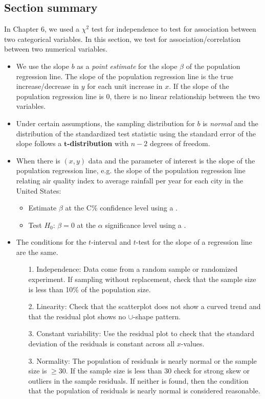 \D{\newpage}

\subsection*{Section summary}

\noindent In Chapter 6, we used a $\chi^2$ test for independence to test for association between two categorical variables.  In this section, we test for association/correlation between two numerical variables.
\begin{itemize}
\item We use the slope $b$ as a \emph{point estimate} for the slope $\beta$ of the population regression line.  The slope of the population regression line is the true increase/decrease in $y$ for each unit increase in $x$.  If the slope of the population regression line is 0, there is no linear relationship between the two variables.  
\item Under certain assumptions, the sampling distribution for $b$ is \emph{normal} and the distribution of the standardized test statistic using the standard error of the slope follows a $\pmb{t}$\textbf{-distribution} with $n-2$ degrees of freedom.

\item When there is $(x, y)$ data and the parameter of interest is the slope of the population regression line, e.g. the slope of the population regression line relating air quality index to average rainfall per year for each city in the United States:
\begin{itemize}
\item Estimate $\beta$ at the C\% confidence level using a .
\item Test $H_0$: $\beta=0$ at the $\alpha$ significance level using a .
\end{itemize}
\item The conditions for the $t$-interval and $t$-test for the slope of a regression line are the same.
\begin{itemize}
\setlength{\itemsep}{0mm}
\item[1.] Independence:  Data come from a random sample or randomized experiment.  If sampling without replacement, check that the sample size is less than 10\% of the population size.
\item[2.] Linearity:  Check that the scatterplot does not show a curved trend and that the residual plot shows no $\cup$-shape pattern.  
\item[3.] Constant variability:  Use the residual plot to check that the standard deviation of the residuals is constant across all $x$-values.
\item[3.] Normality:  The population of residuals is nearly normal or the sample size is $\ge 30$.  If the sample size is less than 30 check for strong skew or outliers in the sample residuals.  If neither is found, then the condition that the population of residuals is nearly normal is considered reasonable.  


\end{itemize}
\end{itemize}
